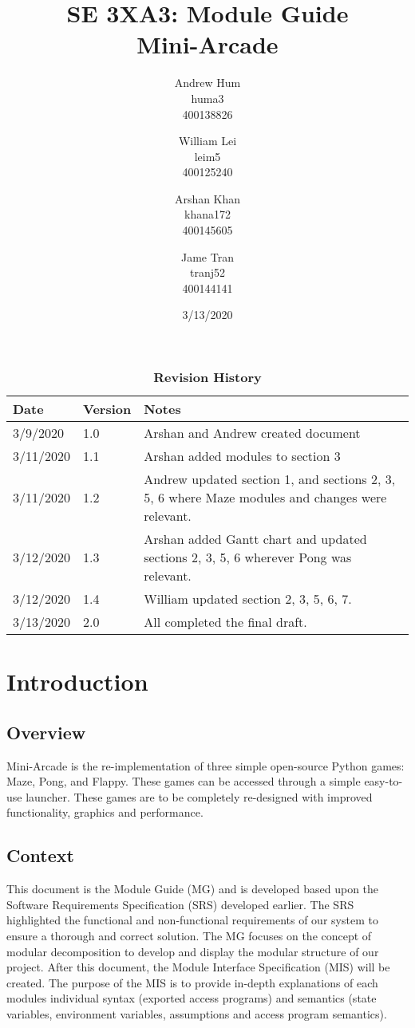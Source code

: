 \documentclass[12pt, titlepage]{article}
\title{SE 3XA3: Module Guide\\Mini-Arcade}
\author{Andrew Hum \\ huma3 \\ 400138826 \and
		William Lei \\ leim5 \\ 400125240 \and
		Arshan Khan \\ khana172 \\ 400145605 \and
		Jame Tran \\ tranj52 \\ 400144141
}
\date{3/13/2020}
\begin{document}
\maketitle

\tableofcontents
\newpage
\listoftables
\listoffigures

\begin{table}[bp]
\caption{\bf Revision History}
\begin{tabularx}{\textwidth}{p{3cm}p{2cm}X}
\toprule {\bf Date} & {\bf Version} & {\bf Notes}\\
\midrule
3/9/2020 & 1.0 & Arshan and Andrew created document\\
3/11/2020 & 1.1 & Arshan added modules to section 3\\
3/11/2020 & 1.2 & Andrew updated section 1, and sections 2, 3, 5, 6 where Maze modules and changes were relevant.\\
3/12/2020 & 1.3 & Arshan added Gantt chart and updated sections 2, 3, 5, 6 wherever Pong was relevant.\\
3/12/2020 & 1.4 & William updated section 2, 3, 5, 6, 7.\\
3/13/2020 & 2.0 & All completed the final draft.\\
\bottomrule
\end{tabularx}
\end{table}

\newpage


\section{Introduction}
\subsection{Overview}
Mini-Arcade is the re-implementation of three simple open-source Python games: Maze, Pong, and Flappy. These games can be accessed through a simple easy-to-use launcher. These games are to be completely re-designed with improved functionality, graphics and performance.
\subsection{Context}
This document is the Module Guide (MG) and is developed based upon the Software Requirements Specification (SRS) developed earlier. The SRS highlighted the functional and non-functional requirements of our system to ensure a thorough and correct solution. The MG focuses on the concept of modular decomposition to develop and display the modular structure of our project. After this document, the Module Interface Specification (MIS) will be created. The purpose of the MIS is to provide in-depth explanations of each modules individual syntax (exported access programs) and semantics (state variables, environment variables, assumptions and access program semantics).
\end{document}
